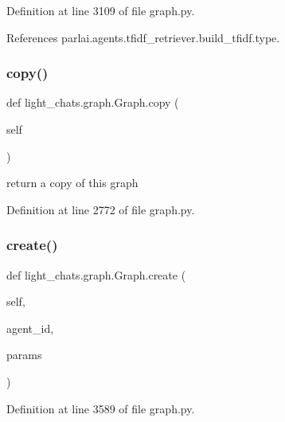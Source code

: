Definition at line 3109 of file graph.\+py.



References parlai.\+agents.\+tfidf\+\_\+retriever.\+build\+\_\+tfidf.\+type.

\mbox{\label{classlight__chats_1_1graph_1_1Graph_a4897dcda9b389f41be824fdffce5055b}} 
\subsubsection{\texorpdfstring{copy()}{copy()}}
{\footnotesize\ttfamily def light\+\_\+chats.\+graph.\+Graph.\+copy (\begin{DoxyParamCaption}\item[{}]{self }\end{DoxyParamCaption})}

\begin{DoxyVerb}return a copy of this graph\end{DoxyVerb}
 

Definition at line 2772 of file graph.\+py.

\mbox{\label{classlight__chats_1_1graph_1_1Graph_acc495d94797d39558b1711d0bbf6346d}} 
\subsubsection{\texorpdfstring{create()}{create()}}
{\footnotesize\ttfamily def light\+\_\+chats.\+graph.\+Graph.\+create (\begin{DoxyParamCaption}\item[{}]{self,  }\item[{}]{agent\+\_\+id,  }\item[{}]{params }\end{DoxyParamCaption})}



Definition at line 3589 of file graph.\+py.



